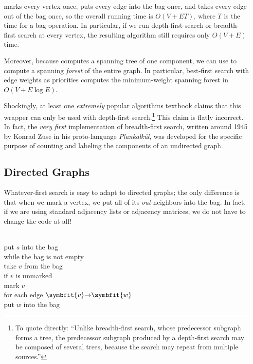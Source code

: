  marks every vertex once, puts every edge into the bag once, and takes every edge out of the bag once, so the overall running time is $O(V + ET)$, where $T$ is the time for a bag operation.
In particular, if we run depth-first search or breadth-first search at every vertex, the resulting algorithm still requires only $O(V + E)$ time.

Moreover, because  computes a spanning tree of one component, we can use  to compute a spanning \textit{forest} of the entire graph.
In particular, best-first search with edge weights as priorities computes the minimum-weight spanning forest in $O(V + E \log E)$.

Shockingly, at least one \textit{extremely} popular algorithms textbook claims that this wrapper can only be used with depth-first search.\footnote{To quote directly: “Unlike breadth-first search, whose predecessor subgraph forms a tree, the predecessor subgraph produced by a depth-first search may be composed of several trees, because the search may repeat from multiple sources.”}
This claim is flatly incorrect.
In fact, the \textit{very first} implementation of breadth-first search, written around 1945 by Konrad Zuse in his proto-language \textit{Plankalkül}, was developed for the specific purpose of counting and labeling the components of an undirected graph.

\subsection{Directed Graphs}

Whatever-first search is easy to adapt to directed graphs; the only difference is that when we mark a vertex, we put all of its \textit{out}-neighbors into the bag.
In fact, if we are using standard adjacency lists or adjacency matrices, we do not have to change the code at all!

\begin{pseudocode}
\\
put $s$ into the bag\\
while the bag is not empty\\
\Indent take $v$ from the bag\\
\Indent if $v$ is unmarked\\
\Indent\Indent mark $v$\\
\Indent\Indent for each edge \mbox{\color{JEred}$\arc{\symbfit{v}}{\symbfit{w}}$}\\
\Indent\Indent\Indent put $w$ into the bag
\end{pseudocode}


